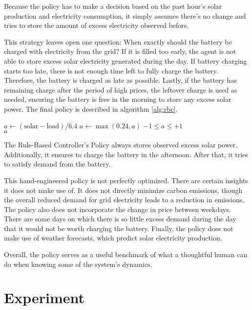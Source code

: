 Because the policy has to make a decision based on the past hour's solar production and electricity consumption, it simply assumes there's no change and tries to store the amount of excess electricity observed before.

This strategy leaves open one question:
When exactly should the battery be charged with electricity from the grid?
If it is filled too early, the agent is not able to store excess solar electricity generated during the day.
If battery charging starts too late, there is not enough time left to fully charge the battery. Therefore, the battery is charged as late as possible.
Lastly, if the battery has remaining charge after the period of high prices, the leftover charge is used as needed, ensuring the battery is free in the morning to store any excess solar power.
The final policy is described in algorithm \ref{alg:rbc}.

\begin{algorithm}[h]
    \begin{algorithmic}
        \State $a \gets (\text{solar} - \text{load})/6.4$ 
            \State $a \gets \max(0.24, a)$ 
        \EndIf
        \Ensure $-1 \leq a \leq +1$ \\
        \Return $a$
    \end{algorithmic}
    \caption{The Rule-Based Controller's Policy always stores observed excess solar power. Additionally, it ensures to charge the battery in the afternoon. After that, it tries to satisfy demand from the battery.}
    \label{alg:rbc}
\end{algorithm}

This hand-engineered policy is not perfectly optimized.
There are certain insights it does not make use of.
It does not directly minimize carbon emissions, though the overall reduced demand for grid electricity leads to a reduction in emissions.
The policy also does not incorporate the change in price between weekdays.
There are some days on which there is so little excess demand during the day that it would not be worth charging the battery.
Finally, the policy does not make use of weather forecasts, which predict solar electricity production.

Overall, the policy serves as a useful benchmark of what a thoughtful human can do when knowing some of the system's dynamics.


\section{Experiment} %

